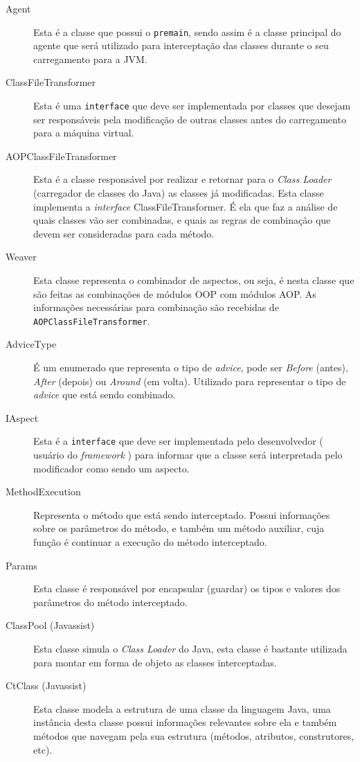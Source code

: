 \documentclass[tc,oneside]{iiufrgs}
\begin{document}
\begin{description}
\item [Agent] Esta é a classe que possui o \texttt{premain}, sendo assim é a classe principal do agente que será utilizado para interceptação das classes durante o seu carregamento para a JVM.
\item [ClassFileTransformer] Esta é uma \texttt{interface} que deve ser implementada por classes que desejam ser responsáveis pela modificação de outras classes antes do carregamento para a máquina virtual.
\item [AOPClassFileTransformer] Esta é a classe responsável por realizar e retornar para o \textit{Class Loader} (carregador de classes do Java) as classes já modificadas. Esta classe implementa a \textit{interface} ClassFileTransformer. É ela que faz a análise de quais classes vão ser combinadas, e quais as regras de combinação que devem ser consideradas para cada método. 
\item [Weaver] Esta classe representa o combinador de aspectos, ou seja, é nesta classe que são feitas as combinações de módulos OOP com módulos AOP. As informações necessárias para combinação são recebidas de \texttt{AOPClassFileTransformer}.
\item [AdviceType] É um enumerado que representa o tipo de \textit{advice}, pode ser \textit{Before} (antes), \textit{After} (depois) ou \textit{Around} (em volta). Utilizado para representar o tipo de \textit{advice} que está sendo combinado.
\item [IAspect] Esta é a \texttt{interface} que deve ser implementada pelo desenvolvedor ( usuário do \textit{framework} ) para informar que a classe será interpretada pelo modificador como sendo um aspecto.
\item [MethodExecution] Representa o método que está sendo interceptado. Possui informações sobre os parâmetros do método, e também um método auxiliar, cuja função é continuar a execução do método interceptado.
\item [Params]  Esta classe é responsável por encapsular (guardar) os tipos e valores dos parâmetros do método interceptado.
\item [ClassPool (Javassist)] Esta classe simula o \textit{Class Loader} do Java, esta classe é bastante utilizada para montar em forma de objeto as classes interceptadas.
\item [CtClass (Javassist)] Esta classe modela a estrutura de uma classe da linguagem Java, uma instância desta classe possui informações relevantes sobre ela e também métodos que navegam pela sua estrutura (métodos, atributos, construtores, etc). 

\end{description}
\end{document}
